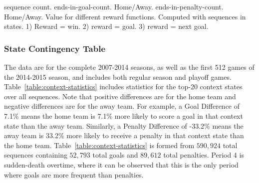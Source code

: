 \documentclass[]{article}
\begin{document}
sequence count.
ends-in-goal-count. Home/Away.
ends-in-penalty-count. Home/Away.
Value for different reward functions. Computed with sequences in states.
1) Reward = win. 2) reward = goal. 3) reward = next goal.

\subsubsection{State Contingency Table}

The data are for the complete 2007-2014 seasons, as well as the first 512 games of the 2014-2015 season, and includes both regular season and playoff games. Table~\ref{table:context-statistics} includes statistics for the top-20 context states over all sequences. Note that positive differences are for the home team and negative differences are for the away team. For example, a Goal Difference of 7.1\% means the home team is 7.1\% more likely to score a goal in that context state than the away team. Similarly, a Penalty Difference of -33.2\% means the away team is 33.2\% more likely to receive a penalty in that context state than the home team. Table~\ref{table:context-statistics} is formed from $590,924$ total sequences containing $52,793$ total goals and $89,612$ total penalties. Period 4 is sudden-death overtime, where it can be observed that this is the only period where goals are more frequent than penalties.



\end{document}
